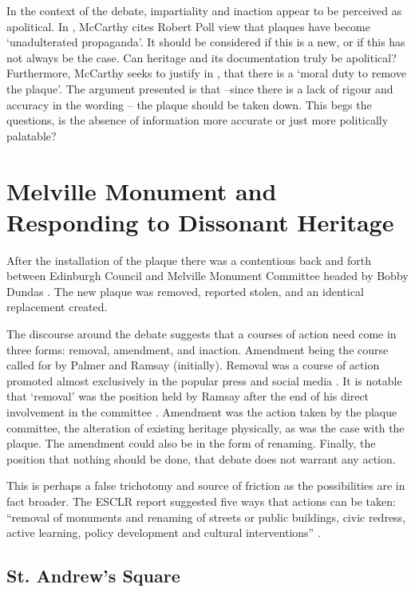 \documentclass{scrartcl}
\renewcommand{\cite}{\parencite}
\begin{document}
In the context of the debate, impartiality and inaction appear to be perceived as apolitical. 
In \cite[][]{mccarthy_2022_2}, McCarthy cites Robert Poll view that plaques have become `unadulterated propaganda'. It should be considered if this is a new, or if this has not always be the case. Can heritage and its documentation truly be apolitical?
Furthermore, McCarthy seeks to justify in \cite[][]{mccarthy_2022_1}, that there is a `moral duty to remove the plaque'. The argument presented is that --since there is a lack of rigour and accuracy in the wording -- the plaque should be taken down. This begs the questions, is the absence of information more accurate or just more politically palatable?

\section{Melville Monument and Responding to Dissonant Heritage}

After the installation of the plaque there was a contentious back and forth between Edinburgh Council and Melville Monument Committee headed by Bobby Dundas \cite[][]{bbc_2023_1, bbc_2023_2, bbc_2024, coec_2024}. The new plaque was removed, reported stolen, and an identical replacement created.

The discourse around the debate suggests that a courses of action need come in three forms: removal, amendment, and inaction. Amendment being the course called for by Palmer and Ramsay (initially).
Removal was a course of action promoted almost exclusively in the popular press and social media \cite[][]{scotsman_2020, daily_2020}. It is notable that `removal' was the position held by Ramsay after the end of his direct involvement in the committee \cite[][]{ramsay_2020}. Amendment was the action taken by the plaque committee, the alteration of existing heritage physically, as was the case with the plaque. The amendment could also be in the form of renaming. Finally, the position that nothing should be done, that debate does not warrant any action.

This is perhaps a false trichotomy and source of friction as the possibilities are in fact broader. 
The ESCLR report suggested five ways that actions can be taken: ``removal of monuments and renaming of streets or public buildings, civic redress, active learning, policy development and cultural interventions'' \cite[][]{esclr_2022}.


\subsection{St. Andrew's Square}
\end{document}

